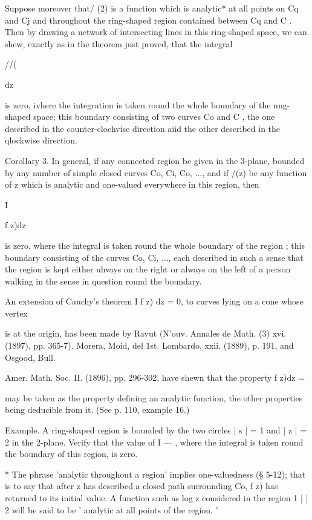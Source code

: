 {Suppose moreover that/ (2) is a function which is analytic* at all
points on Cq and Cj and throughout the ring-shaped region contained
between Cq and C . Then by drawing a network of intersecting lines in
this ring-shaped space, we can shew, exactly as in the theorem just
proved, that the integral



//(



dz



is zero, ivhere the integration is taken round the whole boundary of
the nng-shaped space; this boundary consisting of two curves Co and C
, the one described in the counter-clochvise direction aiid the other
described in the qlockwise direction.

Corollary 3. In general, if any connected region be given in the
3-plane, bounded by any number of simple closed curves Co, Ci, Co,
..., and if /(z) be any function of z which is analytic and one-valued
everywhere in this region, then



I



f z)dz

is zero, where the integral is taken round the whole boundary of the
region ; this boundary consisting of the curves Co, Ci, ..., each
described in such a sense that the region is kept either uhvays on the
right or always on the left of a person walking in the sense in
question round the boundary.

An extension of Cauchy's theorem I f z) dz = 0, to curves lying on a
cone whose vertex

is at the origin, has been made by Ravut (N'ouv. Annales de Math. (3)
xvi. (1897), pp. 365-7). Morera, Moid, del 1st. Lombardo, xxii.
(1889), p. 191, and Osgood, Bull.

Amer. Math. Soc. II. (1896), pp. 296-302, have shewn that the property
f z)dz =

may be taken as the property defining an analytic function, the other
properties being deducible from it. (See p. 110, example 16.)

Example. A ring-shaped region is bounded by the two circles | s | = 1
and | z | = 2 in the 2-plane. Verify that the value of I — , where the
integral is taken round the boundary of this region, is zero.

* The phrase 'analytic throughout a region' implies one-valuedness (§
5-12); that is to say that after z has described a closed path
surrounding Co, f z) has returned to its initial value. A function
such as log z considered in the region 1 | | 2 will be said to be '
analytic at all points of the region. '



}
